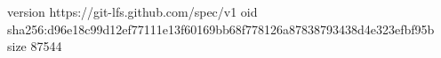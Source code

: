 version https://git-lfs.github.com/spec/v1
oid sha256:d96e18c99d12ef77111e13f60169bb68f778126a87838793438d4e323efbf95b
size 87544
